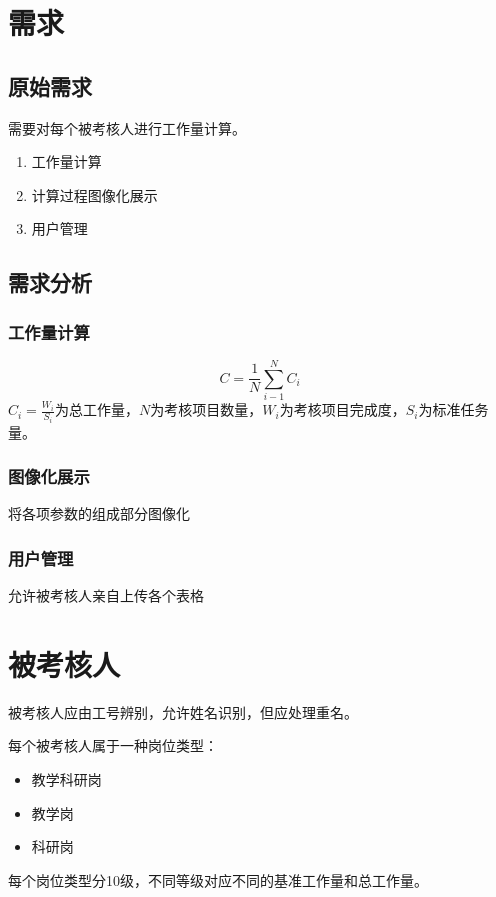 \documentclass[UTF8,fontset=windowsnew]{ctexart}
\begin{document}
\songti

\section{需求}
\subsection{原始需求}
需要对每个被考核人进行工作量计算。
\begin{enumerate}
    \item 工作量计算
    \item 计算过程图像化展示
    \item 用户管理
\end{enumerate}
\subsection{需求分析}
\subsubsection{工作量计算}
\begin{equation}
  C=\frac{1}{N}\sum_{i-1}^NC_i\label{eq:main}
\end{equation}
$C_i=\frac{W_i}{S_i}$为总工作量，$N$为考核项目数量，$W_i$为考核项目完成度，$S_i$为标准任务量。\par
\subsubsection{图像化展示}
将各项参数的组成部分图像化
\subsubsection{用户管理}
允许被考核人亲自上传各个表格
\section{被考核人}
被考核人应由工号辨别，允许姓名识别，但应处理重名。\par
每个被考核人属于一种岗位类型：\par
\begin{itemize}
  \item 教学科研岗
  \item 教学岗
  \item 科研岗
\end{itemize}
每个岗位类型分10级，不同等级对应不同的基准工作量和总工作量。
\end{document}
